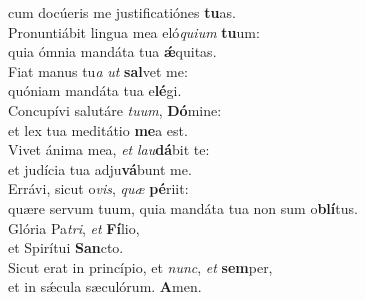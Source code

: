 \oddverse cum docúeris me justificatiónes \textbf{tu}as.\\
\evenverse Pronuntiábit lingua mea eló\textit{qui}\textit{um} \textbf{tu}um:~\*\\
\evenverse quia ómnia mandáta tua \textbf{ǽ}quitas.\\
\oddverse Fiat manus tu\textit{a} \textit{ut} \textbf{sal}vet me:~\*\\
\oddverse quóniam mandáta tua e\textbf{lé}gi.\\
\evenverse Concupívi salutáre \textit{tu}\textit{um}, \textbf{Dó}mine:~\*\\
\evenverse et lex tua meditátio \textbf{me}a est.\\
\oddverse Vivet ánima mea, \textit{et} \textit{lau}\textbf{dá}bit te:~\*\\
\oddverse et judícia tua adju\textbf{vá}bunt me.\\
\evenverse Errávi, sicut o\textit{vis}, \textit{quæ} \textbf{pé}riit:~\*\\
\evenverse quære servum tuum, quia mandáta tua non sum o\textbf{blí}tus.\\
\oddverse Glória Pa\textit{tri}, \textit{et} \textbf{Fí}lio,~\*\\
\oddverse et Spirítui \textbf{San}cto.\\
\evenverse Sicut erat in princípio, et \textit{nunc}, \textit{et} \textbf{sem}per,~\*\\
\evenverse et in sǽcula sæculórum. \textbf{A}men.\\
